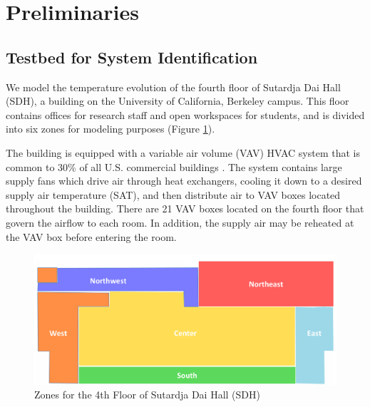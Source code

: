 
\section{Preliminaries}
\label{sec:Preliminaries}

\subsection{Testbed for System Identification}
We model the temperature evolution of the fourth floor of Sutardja Dai Hall (SDH), a building on the University of California, Berkeley campus. This floor contains offices for research staff and open workspaces for students, and is divided into six zones for modeling purposes (Figure \ref{fig:floor_plan}).

The building is equipped with a variable air volume (VAV) HVAC system that is common to 30\% of all U.S. commercial buildings \cite{VAV}. The system contains large supply fans which drive air through heat exchangers, cooling it down to a desired supply air temperature (SAT), and then distribute air to VAV boxes located throughout the building. There are 21 VAV boxes located on the fourth floor that govern the airflow to each room. In addition, the supply air may be reheated at the VAV box before entering the room. 
\begin{figure}[hbtp]
\centering
\vspace*{-0.4cm}
\includegraphics[scale=0.30]{chapters/building_model/figures/FloorPlan.png}
\vspace*{-0.05cm}
\caption{Zones for the 4th Floor of Sutardja Dai Hall (SDH)}
\label{fig:floor_plan}
\vspace*{-0.45cm}
\end{figure}

